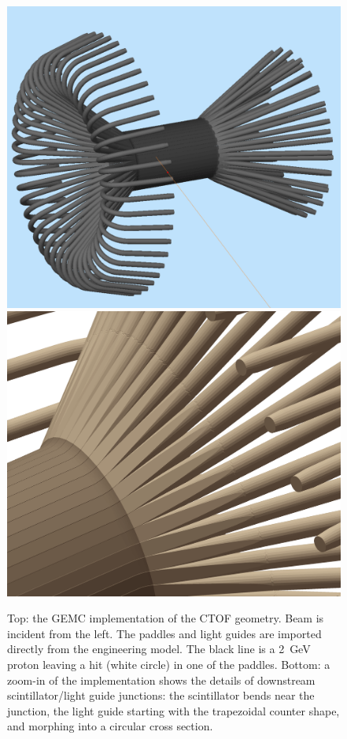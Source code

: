 \begin{figure}
	\centering
	\includegraphics[width=0.99\columnwidth,keepaspectratio]{img/ctofGeometry.png}
	\includegraphics[width=0.99\columnwidth,keepaspectratio]{img/ctofDetail.png}
	\caption{Top: the GEMC implementation of the CTOF geometry. Beam is incident from the left. The paddles and
          light guides are imported directly from the engineering model. The black line is a 2~GeV proton leaving a hit
          (white circle) in one of the paddles. Bottom: a zoom-in of the implementation shows the details of downstream
          scintillator/light guide junctions: the scintillator bends near the junction, the light guide starting with the
          trapezoidal counter shape, and morphing into a circular cross section.}
	\label{fig:ctofGeometry}
\end{figure}


